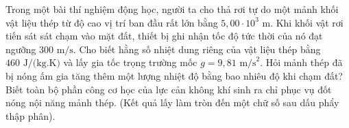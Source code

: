 \begin{ex}	Trong một bài thí nghiệm động học, người ta cho thả rơi tự do một mảnh khối vật liệu thép từ độ cao vị trí ban đầu rất lớn bằng $5,00 \cdot 10^3\text{ m}$. Khi khối vật rơi tiến sát sát chạm vào mặt đất, thiết bị ghi nhận tốc độ tức thời của nó đạt ngưỡng $300\text{ m/s}$. Cho biết hằng số nhiệt dung riêng của vật liệu thép bằng $460\text{ J/(kg.K)}$ và lấy gia tốc trọng trường mốc $g = 9,81\text{ m/s}^2$. Hỏi mảnh thép đã bị nóng ấm gia tăng thêm một lượng nhiệt độ bằng bao nhiêu độ khi chạm đất? Biết toàn bộ phần công cơ học của lực cản không khí sinh ra chỉ phục vụ đốt nóng nội năng mảnh thép. (Kết quả lấy làm tròn đến một chữ số sau dấu phẩy thập phân).

	\par{}
\end{ex}

